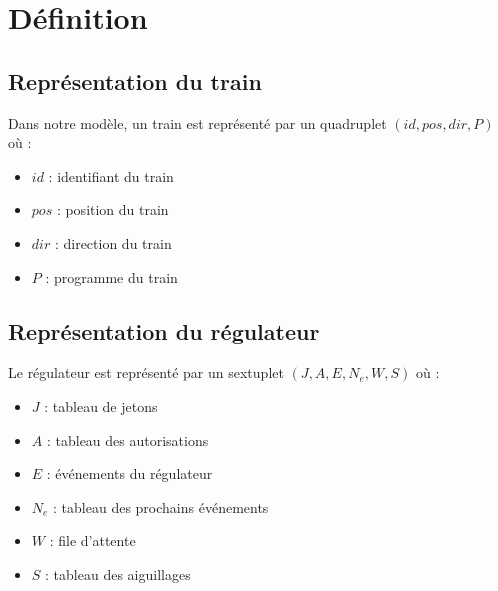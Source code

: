 \documentclass[12pt]{article}
\begin{document}
\newcommand\ruleWait[4]{ %
    \inferrule
    {R.A[#1] = #2 \\ ev(#1,#2) \in R.E \\ R.E[ev[#1, #2]].P = att(#4)  \\ apply(R, ev(#1, #2)) = R'}
    {\trainfull{#1}{#2}{#3}{P}, R \Rightarrow \trainfull{#1}{#2}{#3}{P}, R'}
}

\newcommand\ruleCrash[2]{ %
    \inferrule
        {#1 \neq #2}
        {\Gamma, \train{#1}{pos}{dir}{P}, \train{#2}{pos}{dir'}{P'}  \Rightarrow \bot}
}

\newcommand\ruleCrashSec[3]{ %
    \inferrule
        {\lnot suiv(#2, #3) = \emptyset \\ #3 \neq * \\ R.A[#1] \neq #2}
        {\trainfull{#1}{#2}{#3}{P}, R \Rightarrow \bot}
}
\fi



\maketitle


\section{Définition}

\subsection{Représentation du train}
Dans notre modèle, un train est représenté par un quadruplet $(id, pos, dir, P)$ où :
\begin{itemize}
    \item $id$ : identifiant du train
    \item $pos$ : position du train 
    \item $dir$ : direction du train
    \item $P$ : programme du train
\end{itemize}

\subsection{Représentation du régulateur}
Le régulateur est représenté par un sextuplet $(J, A, E, N_e, W, S)$ où :
\begin{itemize}
    \item $J$ : tableau de jetons
    \item $A$ : tableau des autorisations
    \item $E$ : événements du régulateur
    \item $N_e$ : tableau des prochains événements
    \item $W$ : file d'attente
    \item $S$ : tableau des aiguillages
\end{itemize}
\end{document}
